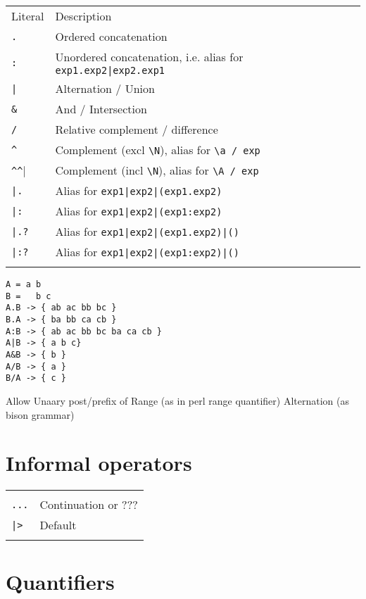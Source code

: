 \documentclass[a4paper]{report}
\begin{document}
\begin{tabular}{p{2cm}p{9.5cm}}
Literal  & Description \\
\verb|.| & Ordered concatenation \\ %
\verb|:| & Unordered concatenation, i.e. alias for \verb#exp1.exp2|exp2.exp1# \\
\verb+|+ & Alternation / Union \\
\verb|&| & And / Intersection \\
\verb|/| & Relative complement / difference \\
\verb|^| & Complement (excl \verb|\N|), alias for \verb|\a / exp| \\
\verb|^^| & Complement (incl \verb|\N|), alias for \verb|\A / exp| \\
\verb#|.# & Alias for \verb#exp1|exp2|(exp1.exp2)#\\
\verb#|:# & Alias for \verb#exp1|exp2|(exp1:exp2)#\\
\verb#|.?# & Alias for \verb#exp1|exp2|(exp1.exp2)|()#\\
\verb#|:?# & Alias for \verb#exp1|exp2|(exp1:exp2)|()#\\
 & \\
\end{tabular}

\begin{verbatim}
A = a b 
B =   b c 
A.B -> { ab ac bb bc }
B.A -> { ba bb ca cb }
A:B -> { ab ac bb bc ba ca cb }
A|B -> { a b c}
A&B -> { b }
A/B -> { a }
B/A -> { c }
\end{verbatim}

Allow Unaary post/prefix of 
Range        (as in perl range quantifier)
Alternation  (as bison grammar)




\section{Informal operators}



\begin{tabular}{p{2cm}p{9.5cm}}
  & \\
\verb|...| & Continuation or ??? \\
\verb+|>+  & Default \\
  & \\
\end{tabular}


\section{Quantifiers}
\end{document}
